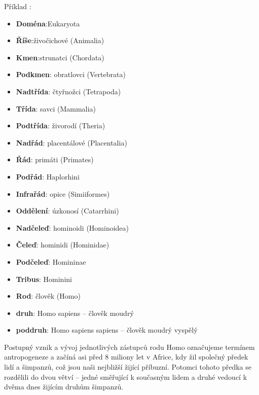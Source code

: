         \begin{tcnote}
          Příklad \wikiKlasCloveka:
          \begin{itemize}[noitemsep]
            \item \textbf{Doména}:Eukaryota
            \item \textbf{Říše}:živočichové (Animalia)
            \item \textbf{Kmen}:strunatci (Chordata)
            \item \textbf{Podkmen}:	obratlovci (Vertebrata)
            \item \textbf{Nadtřída}: čtyřnožci (Tetrapoda)
            \item \textbf{Třída}:	savci (Mammalia)
            \item \textbf{Podtřída}: živorodí (Theria)
            \item \textbf{Nadřád}: placentálové (Placentalia)
            \item \textbf{Řád}:	primáti (Primates)
            \item \textbf{Podřád}: Haplorhini
            \item \textbf{Infrařád}: opice (Simiiformes)
            \item \textbf{Oddělení}: úzkonosí (Catarrhini)
            \item \textbf{Nadčeleď}: hominoidi (Hominoidea)
            \item \textbf{Čeleď}:	hominidi (Hominidae)
            \item \textbf{Podčeleď}: Homininae
            \item \textbf{Tribus}: Hominini
            \item \textbf{Rod}:	člověk (Homo)
            \item \textbf{druh}: Homo sapiens – člověk moudrý
            \item \textbf{poddruh}: Homo sapiens sapiens – člověk moudrý vyspělý
          \end{itemize}
          \tcblower
          Postupný vznik a vývoj jednotlivých zástupců rodu Homo označujeme termínem antropogeneze a
          začíná asi před 8 miliony let v Africe, kdy žil společný předek lidí a šimpanzů, což jsou
          naši nejbližší žijící příbuzní. Potomci tohoto předka se rozdělili do dvou větví – jedné
          směřující k současným lidem a druhé vedoucí k dvěma dnes žijícím druhům šimpanzů.

          \vspace{1em}
          {\centering
          \captionsetup{type=figure} 
          \label{fyz:fig0946}
        \par}

        \end{tcnote}

